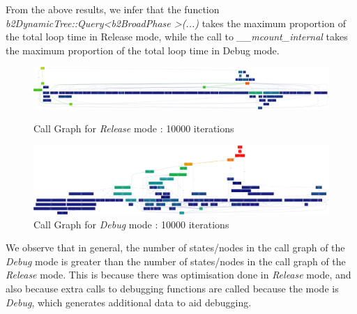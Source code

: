 \documentclass[10pt]{article} \usepackage[a4paper,left=0.8in,right=0.8in,top=0.4in,bottom=0.8in]{geometry} \usepackage{graphicx}
\begin{document}
From the above results, we infer that the function \textit{b2DynamicTree::Query\textless b2BroadPhase \textgreater(...)} takes the maximum proportion of the total loop time in Release mode, while the call to \textit{\_\_mcount\_internal} takes the maximum proportion of the total loop time in Debug mode.

\begin{figure}[ht!] 
\centering 
\includegraphics[width=1\textwidth]{images/release_cg.png} 
\caption{Call Graph for \textit{Release} mode : 10000 iterations}
\includegraphics[width=1\textwidth]{images/debug_cg.png} 
\caption{Call Graph for \textit{Debug} mode : 10000 iterations}
\end{figure}
We observe that in general, the number of states/nodes in the call graph of the \textit{Debug} mode is greater than the number of states/nodes in the call graph of the \textit{Release} mode. This is because there was optimisation done in \textit{Release} mode, and also because extra calls to debugging functions are called because the mode is \textit{Debug}, which generates additional data to aid debugging.
\end{document}
